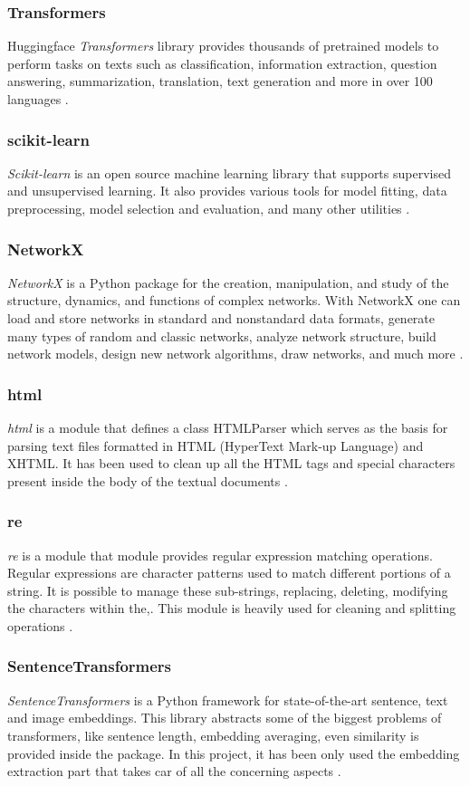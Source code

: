 \documentclass[\main/main.tex]{subfiles}
\begin{document}
\subsubsection{Transformers}
Huggingface \emph{Transformers} library provides thousands of pretrained models to perform tasks on texts such as classification, information extraction, question answering, summarization, translation, text generation and more in over 100 languages \cite{Wolf_Transformers_StateoftheArt_Natural_2020}.
\subsubsection{scikit-learn}
\emph{Scikit-learn} is an open source machine learning library that supports supervised and unsupervised learning. It also provides various tools for model fitting, data preprocessing, model selection and evaluation, and many other utilities \cite{scikit-learn}.
\subsubsection{NetworkX}
\emph{NetworkX} is a Python package for the creation, manipulation, and study of the structure, dynamics, and functions of complex networks. With NetworkX one can load and store networks in standard and nonstandard data formats, generate many types of random and classic networks, analyze network structure, build network models, design new network algorithms, draw networks, and much more \cite{SciPyProceedings_11}.
\subsubsection{html}
\emph{html} is a module that defines a class HTMLParser which serves as the basis for parsing text files formatted in HTML (HyperText Mark-up Language) and XHTML. It has been used to clean up all the HTML tags and special characters present inside the body of the textual documents \cite{html_parser}.
\subsubsection{re}
\emph{re} is a module that module provides regular expression matching operations. Regular expressions are character patterns used to match different portions of a string. It is possible to manage these sub-strings, replacing, deleting, modifying the characters within the,. This module is heavily used for cleaning and splitting operations \cite{re}.
\subsubsection{SentenceTransformers}
\emph{SentenceTransformers} is a Python framework for state-of-the-art sentence, text and image embeddings. This library abstracts some of the biggest problems of transformers, like sentence length, embedding averaging, even similarity is provided inside the package. In this project, it has been only used the embedding extraction part that takes car of all the concerning aspects \cite{sentence-transformers}.
\end{document}
